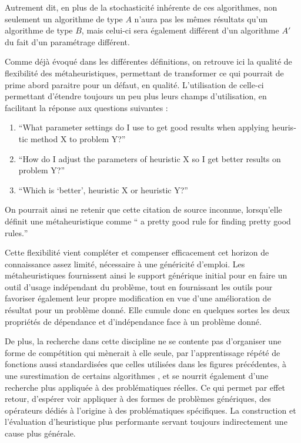 Autrement dit, en plus de la stochasticité inhérente de ces algorithmes, non seulement un algorithme de type $A$ n'aura pas les mêmes résultats qu'un algorithme de type $B$, mais celui-ci sera également différent d'un algorithme $A'$ du fait d'un paramétrage différent.

Comme déjà évoqué dans les différentes définitions, on retrouve ici la qualité de flexibilité des métaheuristiques, permettant de transformer ce qui pourrait de prime abord paraitre pour un défaut, en qualité. L'utilisation de celle-ci permettant d'étendre toujours un peu plus leurs champs d'utilisation, en facilitant la réponse aux questions suivantes  :
\begin{enumerate}
\item  \foreignquote{english}{What parameter settings do I use to get good results when applying heuristic method X to problem Y?}
\item  \foreignquote{english}{How do I adjust the parameters of heuristic X so I get better results on problem Y?}
\item \foreignquote{english}{Which is \enquote{better}, heuristic X or heuristic Y?}
\end{enumerate}

On pourrait ainsi ne retenir que cette citation de source inconnue, lorsqu'elle définit une métaheuristique comme \foreignquote{english}{ a pretty good rule for finding pretty good rules.}

Cette flexibilité vient compléter et compenser efficacement cet horizon de connaissance assez limité, nécessaire à une généricité d'emploi. Les métaheuristiques fournissent ainsi le support générique initial pour en faire un outil d'usage indépendant du problème, tout en fournissant les outils pour favoriser également leur propre modification en vue d'une amélioration de résultat pour un problème donné. Elle cumule donc en quelques sortes les deux propriétés de dépendance et d'indépendance face à un problème donné.

De plus, la recherche dans cette discipline ne se contente pas d'organiser une forme de compétition qui mènerait à elle seule, par l'apprentissage répété de fonctions aussi standardisées que celles utilisées dans les figures précédentes, à une surestimation de certains algorithmes , et se nourrit également d'une recherche plus appliquée à des problématiques réelles. Ce qui permet par effet retour, d'espérer voir appliquer à des formes de problèmes génériques, des opérateurs dédiés à l'origine à des problématiques spécifiques. La construction et l'évaluation d'heuristique plus performante servant toujours indirectement une cause plus générale.

